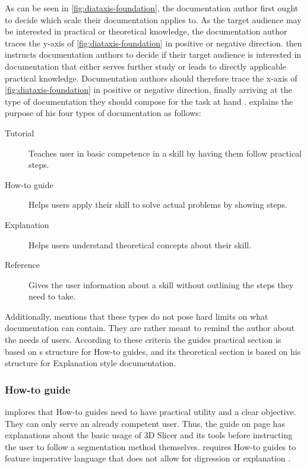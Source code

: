 \noindent
As can be seen in \cref{fig:diataxis-foundation}, the documentation author first ought to decide which scale their documentation applies to.
As the target audience may be interested in practical or theoretical knowledge, the documentation author traces the y-axis of \cref{fig:diataxis-foundation} in positive or negative direction.
\citeauthor{procidaDiataxisDocumentationFramework2023} then instructs documentation authors to decide if their target audience is interested in documentation that either serves further study or leads to directly applicable practical knowledge.
Documentation authors should therefore trace the x-axis of \cref{fig:diataxis-foundation} in positive or negative direction, finally arriving at the type of documentation they should compose for the task at hand \cite{procidaPythonDocsCommunity2022}.
\citeauthor{procidaDiataxisDocumentationFramework2023} explains the purpose of his four types of documentation as follows:
\begin{description}
	\item[Tutorial] Teaches user in basic competence in a skill by having them follow practical steps.
	\item[How-to guide] Helps users apply their skill to solve actual problems by showing steps.
	\item[Explanation] Helps users understand theoretical concepts about their skill.
	\item[Reference] Gives the user information about a skill without outlining the steps they need to take.
\end{description}
Additionally, \citeauthor{procidaDiataxisDocumentationFramework2023} mentions that these types do not pose hard limits on what documentation can contain. They are rather meant to remind the author about the needs of users.
According to these criteria the guides practical section is based on \citeauthor{procidaDiataxisDocumentationFramework2023}s structure for How-to guides, and its theoretical section is based on his structure for Explanation style documentation.

\subsubsection*{How-to guide}
\citeauthor{procidaDiataxisDocumentationFramework2023} implores that How-to guides need to have practical utility and a clear objective.
They can only serve an already competent user.
Thus, the guide on page \pageref{a:guide} has explanations about the basic usage of 3D Slicer and its tools before instructing the user to follow a segmentation method themselves.
\citeauthor{procidaDiataxisDocumentationFramework2023} requires How-to guides to feature imperative language that does not allow for digression or explanation \cite{procidaPythonDocsCommunity2022,procidaDiataxisDocumentationFramework2023}.

